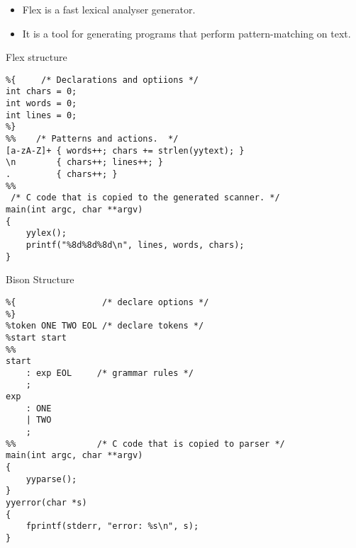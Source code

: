 \documentclass[compress]{beamer}
\begin{document}
\note
{
    \begin{itemize}
        \item Flex is a fast lexical analyser generator. 
        \item It is a tool for generating programs that perform pattern-matching on text.
        \end{itemize}
}


\begin{frame}[containsverbatim]{Flex structure}
\scriptsize{\begin{verbatim}
%{     /* Declarations and optiions */
int chars = 0;
int words = 0;
int lines = 0;
%}
%%    /* Patterns and actions.  */
[a-zA-Z]+ { words++; chars += strlen(yytext); }
\n        { chars++; lines++; }
.         { chars++; }
%%
 /* C code that is copied to the generated scanner. */
main(int argc, char **argv)
{
    yylex();
    printf("%8d%8d%8d\n", lines, words, chars);
}
\end{verbatim}}
\end{frame}	


\begin{frame}[containsverbatim]{Bison Structure}
\scriptsize{\begin{verbatim}
%{                 /* declare options */
%}                  
%token ONE TWO EOL /* declare tokens */
%start start
%%               
start
    : exp EOL     /* grammar rules */
    ;
exp
    : ONE 
    | TWO
    ;
%%                /* C code that is copied to parser */
main(int argc, char **argv)
{
    yyparse();
}
yyerror(char *s)
{
    fprintf(stderr, "error: %s\n", s);
}
\end{verbatim}}

\end{frame}
\end{document}

